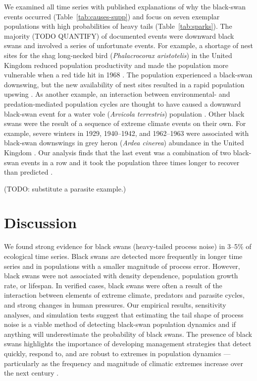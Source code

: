 We examined all time series with published explanations of why the black-swan events occurred (Table~\ref{tab:causes-supp}) and focus on seven exemplar populations with high probabilities of heavy tails (Table~\ref{tab:sparks}). The majority (TODO QUANTIFY) of documented events were downward black swans and involved a series of unfortunate events. For example, a shortage of nest sites for the shag long-necked bird (\textit{Phalacrocorax aristotelis}) in the United Kingdom reduced population productivity and made the population more vulnerable when a red tide hit in 1968 \citep{potts1980}. The population experienced a black-swan downswing, but the new availability of nest sites resulted in a rapid population upswing \citep{potts1980}. As another example, an interaction between environmental- and predation-mediated population cycles are thought to have caused a downward black-swan event for a water vole (\textit{Arvicola terrestris}) population \citep{saucy1994}. Other black swans were the result of a sequence of extreme climate events on their own. For example, severe winters in 1929, 1940--1942, and 1962--1963 were associated with black-swan downswings in grey heron (\textit{Ardea cinerea}) abundance in the United Kingdom \citep{stafford1971}. Our analysis finds that the last event was a combination of two black-swan events in a row and it took the population three times longer to recover than predicted \citep{stafford1971}.

(TODO: substitute a parasite example.)


\section{Discussion}

We found strong evidence for black swans (heavy-tailed process noise) in 3--5\% of ecological time series. Black swans are detected more frequently in longer time series and in populations with a smaller magnitude of process error. However, black swans were not associated with density dependence, population growth rate, or lifespan. In verified cases, black swans were often a result of the interaction between elements of extreme climate, predators and parasite cycles, and strong changes in human pressures. Our empirical results, sensitivity analyses, and simulation tests suggest that estimating the tail shape of process noise is a viable method of detecting black-swan population dynamics and if anything will underestimate the probability of black swans. The presence of black swans highlights the importance of developing management strategies that detect quickly, respond to, and are robust to extremes in population dynamics --- particularly as the frequency and magnitude of climatic extremes increase over the next century \citep{easterling2000,ipcc2012}.

